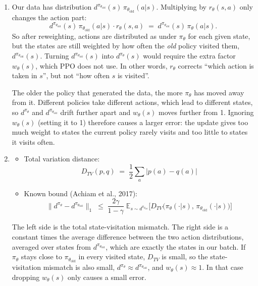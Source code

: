 \documentclass[11pt]{article}
\newcommand{\piold}{\pi_{\theta_{\mathrm{old}}}}
\newcommand{\E}{\mathbb{E}}
\begin{document}
\begin{enumerate}[label=(\alph*)]
  \item Our data has distribution $d^{\piold}(s)\,\piold(a|s)$. Multiplying by $r_\theta(s,a)$ only
        changes the action part:
        \[
          d^{\piold}(s)\,\piold(a|s)\cdot r_\theta(s,a) \;=\; d^{\piold}(s)\,\pi_\theta(a|s).
        \]
        So after reweighting, actions are distributed as under $\pi_\theta$ for each given state, but
        the states are still weighted by how often the \emph{old} policy visited them, $d^{\piold}(s)$.
        Turning $d^{\piold}(s)$ into $d^{\pi_\theta}(s)$ would require the extra factor $w_\theta(s)$,
        which PPO does not use. In other words, $r_\theta$ corrects ``which action is taken in $s$'', but
        not ``how often $s$ is visited''.

        The older the policy that generated the data, the more $\pi_\theta$ has moved away from it.
        Different policies take different actions, which lead to different states, so $d^{\pi_\theta}$
        and $d^{\piold}$ drift further apart and $w_\theta(s)$ moves further from 1. Ignoring
        $w_\theta(s)$ (setting it to 1) therefore causes a larger error: the update gives too much weight
        to states the current policy rarely visits and too little to states it visits often.

  \item
        \begin{itemize}
          \item Total variation distance:
                \[
                  D_{TV}(p, q) \;=\; \frac{1}{2}\sum_{a} \left| p(a) - q(a) \right|
                \]

          \item Known bound (Achiam et al., 2017):
                \[
                  \big\| d^{\pi_\theta} - d^{\piold} \big\|_1
                  \;\le\; \frac{2\gamma}{1-\gamma}\;
                  \E_{s \sim d^{\piold}}\!\Big[ D_{TV}\big(\pi_\theta(\cdot|s),\, \piold(\cdot|s)\big) \Big]
                \]
        \end{itemize}

        The left side is the total state-visitation mismatch. The right side is a constant times the
        average difference between the two action distributions, averaged over states from
        $d^{\piold}$, which are exactly the states in our batch. If $\pi_\theta$ stays close to $\piold$
        in every visited state, $D_{TV}$ is small, so the state-visitation mismatch is also small,
        $d^{\pi_\theta} \approx d^{\piold}$, and $w_\theta(s) \approx 1$. In that case dropping
        $w_\theta(s)$ only causes a small error.


\end{enumerate}
\end{document}
